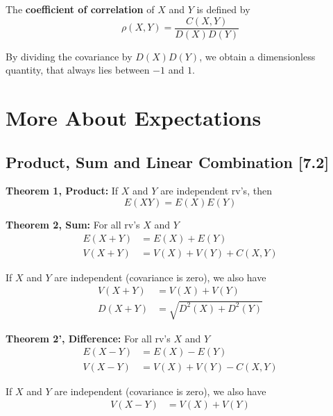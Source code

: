 \documentclass[a4paper,9pt]{extarticle}
\begin{document}
\begin{multicols*}{2}
The \textbf{coefficient of correlation} of $X$ and $Y$ is defined by
\begin{equation}
    \rho(X, Y) = \frac{C(X,Y)}{D(X)D(Y)}
\end{equation}

By dividing the covariance by $D(X)D(Y)$, we obtain a dimensionless quantity, that always lies between $-1$ and $1$.

\section{More About Expectations}
\subsection{Product, Sum and Linear Combination [7.2]}

\textbf{Theorem 1, Product:} If $X$ and $Y$ are independent rv's, then
\begin{equation}
    E(X Y) = E(X) E(Y)
\end{equation}

\textbf{Theorem 2, Sum:} For all rv's $X$ and $Y$
\begin{equation}
    \begin{split}
        E(X + Y) & = E(X) + E(Y) \\
        V(X + Y) & = V(X) + V(Y) + C(X, Y)
    \end{split}
\end{equation}

If $X$ and $Y$ are independent (covariance is zero), we also have
\begin{equation}
    \begin{split}
        V(X + Y) & = V(X) + V(Y) \\
        D(X + Y) & = \sqrt{D^2(X) + D^2(Y)}
    \end{split}
\end{equation}

\textbf{Theorem 2', Difference:} For all rv's $X$ and $Y$
\begin{equation}
    \begin{split}
        E(X - Y) & = E(X) - E(Y) \\
        V(X - Y) & = V(X) + V(Y) - C(X, Y)
    \end{split}
\end{equation}

If $X$ and $Y$ are independent (covariance is zero), we also have
\begin{equation}
    \begin{split}
        V(X - Y) & = V(X) + V(Y)
    \end{split}
\end{equation}


\end{multicols*}
\end{document}
